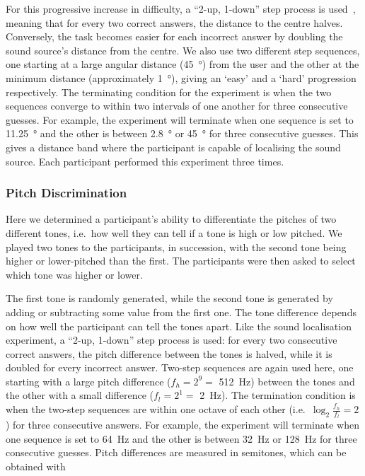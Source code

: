 \documentclass[]{interact}
\begin{document}
For this progressive increase in difficulty, a ``2-up, 1-down'' step process is used~\citep{wetherill1965sequential,levitt1971transformed}, meaning that for every two correct answers, the distance to the centre halves.
Conversely, the task becomes easier for each incorrect answer by doubling the sound source's distance from the centre.
We also use two different step sequences, one starting at a large angular distance (\SI{45}{\degree}) from the user and the other at the minimum distance (approximately \SI{1}{\degree}), giving an `easy' and a `hard' progression respectively.
The terminating condition for the experiment is when the two sequences converge to within two intervals of one another for three consecutive guesses.
For example, the experiment will terminate when one sequence is set to \SI{11.25}{\degree} and the other is between \SI{2.8}{\degree} or \SI{45}{\degree} for three consecutive guesses.
This gives a distance band where the participant is capable of localising the sound source.
Each participant performed this experiment three times. 

\subsubsection{Pitch Discrimination}\label{sec:pitch_discrimination}

Here we determined a participant's ability to differentiate the pitches of two different tones, i.e.\ how well they can tell if a tone is high or low pitched.
We played two tones to the participants, in succession, with the second tone being higher or lower-pitched than the first.
The participants were then asked to select which tone was higher or lower.

The first tone is randomly generated, while the second tone is generated by adding or subtracting some value from the first one.
The tone difference depends on how well the participant can tell the tones apart.
Like the sound localisation experiment, a ``2-up, 1-down'' step process is used: for every two consecutive correct answers, the pitch difference between the tones is halved, while it is doubled for every incorrect answer.
Two-step sequences are again used here, one starting with a large pitch difference ($f_h=2^9=$ \SI{512}{\hertz}) between the tones and the other with a small difference ($f_l=2^1=$ \SI{2}{\hertz}).
The termination condition is when the two-step sequences are within one octave of each other (i.e.\ $\log_2\frac{f_h}{f_l}=2$) for three consecutive answers.
For example, the experiment will terminate when one sequence is set to \SI{64}{\hertz} and the other is between \SI{32}{\hertz} or \SI{128}{\hertz} for three consecutive guesses.
Pitch differences are measured in semitones, which can be obtained with
\end{document}
